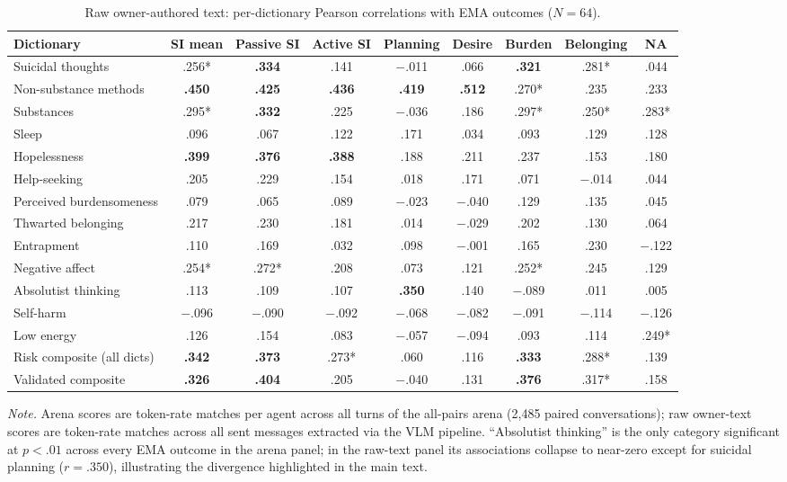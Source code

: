 \documentclass[review,12pt,authoryear]{elsarticle}
\begin{document}
\begin{table}[H]
\centering
\footnotesize
\caption{Raw owner-authored text: per-dictionary Pearson correlations with EMA outcomes ($N = 64$).}
\label{tab:supp_s2_raw}
\setlength{\tabcolsep}{4pt}
\begin{tabular}{@{}lcccccccc@{}}
\toprule
Dictionary & SI mean & Passive SI & Active SI & Planning & Desire & Burden & Belonging & NA \\
\midrule
Suicidal thoughts & .256* & \textbf{.334} & .141 & $-$.011 & .066 & \textbf{.321} & .281* & .044 \\
Non-substance methods & \textbf{.450} & \textbf{.425} & \textbf{.436} & \textbf{.419} & \textbf{.512} & .270* & .235 & .233 \\
Substances & .295* & \textbf{.332} & .225 & $-$.036 & .186 & .297* & .250* & .283* \\
Sleep & .096 & .067 & .122 & .171 & .034 & .093 & .129 & .128 \\
Hopelessness & \textbf{.399} & \textbf{.376} & \textbf{.388} & .188 & .211 & .237 & .153 & .180 \\
Help-seeking & .205 & .229 & .154 & .018 & .171 & .071 & $-$.014 & .044 \\
Perceived burdensomeness & .079 & .065 & .089 & $-$.023 & $-$.040 & .129 & .135 & .045 \\
Thwarted belonging & .217 & .230 & .181 & .014 & $-$.029 & .202 & .130 & .064 \\
Entrapment & .110 & .169 & .032 & .098 & $-$.001 & .165 & .230 & $-$.122 \\
Negative affect & .254* & .272* & .208 & .073 & .121 & .252* & .245 & .129 \\
Absolutist thinking & .113 & .109 & .107 & \textbf{.350} & .140 & $-$.089 & .011 & .005 \\
Self-harm & $-$.096 & $-$.090 & $-$.092 & $-$.068 & $-$.082 & $-$.091 & $-$.114 & $-$.126 \\
Low energy & .126 & .154 & .083 & $-$.057 & $-$.094 & .093 & .114 & .249* \\
\midrule
Risk composite (all dicts) & \textbf{.342} & \textbf{.373} & .273* & .060 & .116 & \textbf{.333} & .288* & .139 \\
Validated composite & \textbf{.326} & \textbf{.404} & .205 & $-$.040 & .131 & \textbf{.376} & .317* & .158 \\
\bottomrule
\end{tabular}
\end{table}

\noindent\textit{Note.} Arena scores are token-rate matches per agent across all turns of the all-pairs arena (2,485 paired conversations); raw owner-text scores are token-rate matches across all sent messages extracted via the VLM pipeline. ``Absolutist thinking'' is the only category significant at $p < .01$ across every EMA outcome in the arena panel; in the raw-text panel its associations collapse to near-zero except for suicidal planning ($r = .350$), illustrating the divergence highlighted in the main text.
\end{document}
